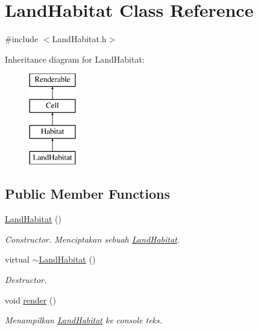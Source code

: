 \hypertarget{classLandHabitat}{\section{Land\+Habitat Class Reference}
\label{classLandHabitat}
}


{\ttfamily \#include $<$Land\+Habitat.\+h$>$}

Inheritance diagram for Land\+Habitat\+:\begin{figure}[H]
\begin{center}
\leavevmode
\includegraphics[height=4.000000cm]{classLandHabitat}
\end{center}
\end{figure}
\subsection*{Public Member Functions}
\begin{DoxyCompactItemize}
\item 
\hypertarget{classLandHabitat_afa67ffdf6984ec7c1fcc6ec27d5628d3}{\hyperlink{classLandHabitat_afa67ffdf6984ec7c1fcc6ec27d5628d3}{Land\+Habitat} ()}\label{classLandHabitat_afa67ffdf6984ec7c1fcc6ec27d5628d3}

\begin{DoxyCompactList}\small\item\em Constructor. Menciptakan sebuah \hyperlink{classLandHabitat}{Land\+Habitat}. \end{DoxyCompactList}\item 
\hypertarget{classLandHabitat_a0c1aebc080f875b9053f3a776aea627a}{virtual \hyperlink{classLandHabitat_a0c1aebc080f875b9053f3a776aea627a}{$\sim$\+Land\+Habitat} ()}\label{classLandHabitat_a0c1aebc080f875b9053f3a776aea627a}

\begin{DoxyCompactList}\small\item\em Destructor. \end{DoxyCompactList}\item 
\hypertarget{classLandHabitat_ad90a2fd22fa5b521d5e19e61798e3175}{void \hyperlink{classLandHabitat_ad90a2fd22fa5b521d5e19e61798e3175}{render} ()}\label{classLandHabitat_ad90a2fd22fa5b521d5e19e61798e3175}

\begin{DoxyCompactList}\small\item\em Menampilkan \hyperlink{classLandHabitat}{Land\+Habitat} ke console teks. \end{DoxyCompactList}\end{DoxyCompactItemize}
